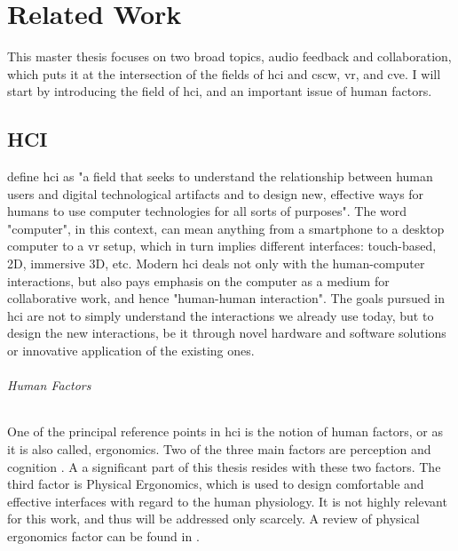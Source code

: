
\chapter{Related Work}
This master thesis focuses on two broad topics, audio feedback and collaboration, which puts it at the intersection of the fields of \gls{hci} and \gls{cscw}, \gls{vr}, and \gls{cve}. I will start by introducing the field of \gls{hci}, and an important issue of human factors.

\section{HCI}
\cite[Chapter~4.1.1]{jr_3d_2017} define \gls{hci} as "a field that seeks to understand the relationship between human users and digital technological artifacts and to design new, effective ways for humans to use computer technologies for all sorts of purposes". The word "computer", in this context, can mean anything from a smartphone to a desktop computer to a \gls{vr} setup, which in turn implies different interfaces: touch-based, 2D, immersive 3D, etc. Modern \gls{hci} deals not only with the human-computer interactions, but also pays emphasis on the computer as a medium for collaborative work, and hence "human-human interaction". The goals pursued in \gls{hci} are not to simply understand the interactions we already use today, but to design the new interactions, be it through novel hardware and software solutions or innovative application of the existing ones. 

\subparagraph{Human Factors}
One of the principal reference points in \gls{hci} is the notion of human factors, or as it is also called, ergonomics. Two of the three main factors are perception and cognition \cite{jr_3d_2017}. A a significant part of this thesis resides with these two factors. The third factor is Physical Ergonomics, which is used to design comfortable and effective interfaces with regard to the human physiology. It is not highly relevant for this work, and thus will be addressed only scarcely. A review of physical ergonomics factor can be found in \cite[Chapter~3.5]{jr_3d_2017}.

